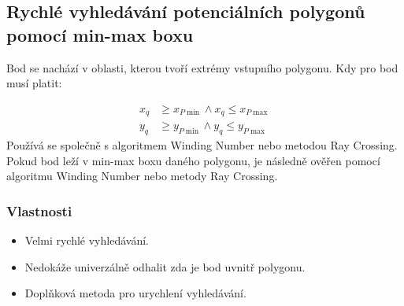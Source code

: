 

\newpage
\subsection{Rychlé vyhledávání potenciálních polygonů pomocí min-max boxu}

Bod se nachází v oblasti, kterou tvoří extrémy vstupního polygonu. Kdy pro bod musí platit:


\begin{equation}
\begin{aligned}
    x_q &\geq x_{P\min} \land x_q \leq x_{P\max} \\
    y_q &\geq y_{P\min} \land y_q \leq y_{P\max}
\end{aligned}
\end{equation}
Používá se společně s algoritmem Winding Number nebo metodou Ray Crossing. Pokud bod leží v min-max boxu daného polygonu, je následně ověřen pomocí algoritmu Winding Number nebo metody Ray Crossing.


\subsubsection{Vlastnosti}
\begin{itemize}
    \item Velmi rychlé vyhledávání.
    \item Nedokáže univerzálně odhalit zda je bod uvnitř polygonu.
    \item Doplňková metoda pro urychlení vyhledávání.
\end{itemize}
